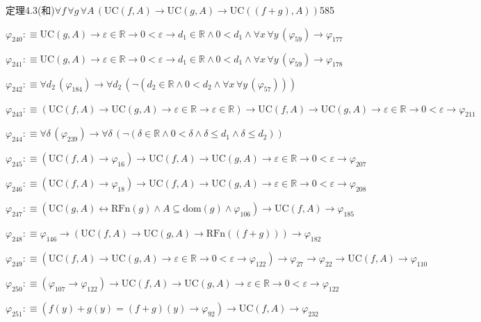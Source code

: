 \begin{fullproof}{定理4.3(和)}{$\forall f\,\forall g\,\forall A\,(\mathrm{UC}(f,A) \to \mathrm{UC}(g,A) \to \mathrm{UC}((f + g),A))$}{585}
\begin{abbrevlist}
\item $\varphi_{240} :\equiv \mathrm{UC}(g,A) \to \varepsilon \in \mathbb{R} \to 0 < \varepsilon \to d_{1} \in \mathbb{R} \land 0 < d_{1} \land \forall x\,\forall y\,(\varphi_{59}) \to \varphi_{177}$
\item $\varphi_{241} :\equiv \mathrm{UC}(g,A) \to \varepsilon \in \mathbb{R} \to 0 < \varepsilon \to d_{1} \in \mathbb{R} \land 0 < d_{1} \land \forall x\,\forall y\,(\varphi_{59}) \to \varphi_{178}$
\item $\varphi_{242} :\equiv \forall d_{2}\,(\varphi_{184}) \to \forall d_{2}\,(\neg (d_{2} \in \mathbb{R} \land 0 < d_{2} \land \forall x\,\forall y\,(\varphi_{57})))$
\item $\varphi_{243} :\equiv (\mathrm{UC}(f,A) \to \mathrm{UC}(g,A) \to \varepsilon \in \mathbb{R} \to \varepsilon \in \mathbb{R}) \to \mathrm{UC}(f,A) \to \mathrm{UC}(g,A) \to \varepsilon \in \mathbb{R} \to 0 < \varepsilon \to \varphi_{211}$
\item $\varphi_{244} :\equiv \forall \delta\,(\varphi_{239}) \to \forall \delta\,(\neg (\delta \in \mathbb{R} \land 0 < \delta \land \delta \leq d_{1} \land \delta \leq d_{2}))$
\item $\varphi_{245} :\equiv (\mathrm{UC}(f,A) \to \varphi_{16}) \to \mathrm{UC}(f,A) \to \mathrm{UC}(g,A) \to \varepsilon \in \mathbb{R} \to 0 < \varepsilon \to \varphi_{207}$
\item $\varphi_{246} :\equiv (\mathrm{UC}(f,A) \to \varphi_{18}) \to \mathrm{UC}(f,A) \to \mathrm{UC}(g,A) \to \varepsilon \in \mathbb{R} \to 0 < \varepsilon \to \varphi_{208}$
\item $\varphi_{247} :\equiv (\mathrm{UC}(g,A) \leftrightarrow \mathrm{RFn}(g) \land A \subseteq \mathrm{dom}(g) \land \varphi_{106}) \to \mathrm{UC}(f,A) \to \varphi_{185}$
\item $\varphi_{248} :\equiv \varphi_{146} \to (\mathrm{UC}(f,A) \to \mathrm{UC}(g,A) \to \mathrm{RFn}((f + g))) \to \varphi_{182}$
\item $\varphi_{249} :\equiv (\mathrm{UC}(f,A) \to \mathrm{UC}(g,A) \to \varepsilon \in \mathbb{R} \to 0 < \varepsilon \to \varphi_{122}) \to \varphi_{27} \to \varphi_{22} \to \mathrm{UC}(f,A) \to \varphi_{110}$
\item $\varphi_{250} :\equiv (\varphi_{107} \to \varphi_{122}) \to \mathrm{UC}(f,A) \to \mathrm{UC}(g,A) \to \varepsilon \in \mathbb{R} \to 0 < \varepsilon \to \varphi_{122}$
\item $\varphi_{251} :\equiv (f(y) + g(y) = (f + g)(y) \to \varphi_{92}) \to \mathrm{UC}(f,A) \to \varphi_{232}$

\end{abbrevlist}
\end{fullproof}
